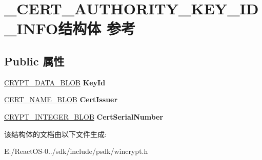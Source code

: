 \hypertarget{struct___c_e_r_t___a_u_t_h_o_r_i_t_y___k_e_y___i_d___i_n_f_o}{}\section{\+\_\+\+C\+E\+R\+T\+\_\+\+A\+U\+T\+H\+O\+R\+I\+T\+Y\+\_\+\+K\+E\+Y\+\_\+\+I\+D\+\_\+\+I\+N\+F\+O结构体 参考}
\label{struct___c_e_r_t___a_u_t_h_o_r_i_t_y___k_e_y___i_d___i_n_f_o}
\subsection*{Public 属性}
\begin{DoxyCompactItemize}
\item 
\mbox{\label{struct___c_e_r_t___a_u_t_h_o_r_i_t_y___k_e_y___i_d___i_n_f_o_a075ff46170c6868dd58d51d2b7b9a45a}} 
\hyperlink{struct___c_r_y_p_t_o_a_p_i___b_l_o_b}{C\+R\+Y\+P\+T\+\_\+\+D\+A\+T\+A\+\_\+\+B\+L\+OB} {\bfseries Key\+Id}
\item 
\mbox{\label{struct___c_e_r_t___a_u_t_h_o_r_i_t_y___k_e_y___i_d___i_n_f_o_a8be067048b54eb0a3cbb13a590fe0b5a}} 
\hyperlink{struct___c_r_y_p_t_o_a_p_i___b_l_o_b}{C\+E\+R\+T\+\_\+\+N\+A\+M\+E\+\_\+\+B\+L\+OB} {\bfseries Cert\+Issuer}
\item 
\mbox{\label{struct___c_e_r_t___a_u_t_h_o_r_i_t_y___k_e_y___i_d___i_n_f_o_ab7d6be275724c48cfa107c73ae91c029}} 
\hyperlink{struct___c_r_y_p_t_o_a_p_i___b_l_o_b}{C\+R\+Y\+P\+T\+\_\+\+I\+N\+T\+E\+G\+E\+R\+\_\+\+B\+L\+OB} {\bfseries Cert\+Serial\+Number}
\end{DoxyCompactItemize}


该结构体的文档由以下文件生成\+:\begin{DoxyCompactItemize}
\item 
E\+:/\+React\+O\+S-\/0../sdk/include/psdk/wincrypt.\+h\end{DoxyCompactItemize}
